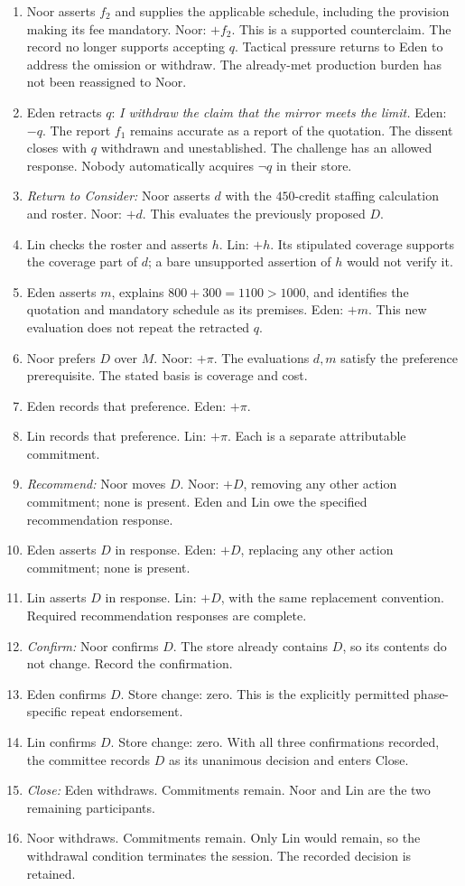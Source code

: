 \begin{enumerate}
Eden retains persuasion responsibility.
\item Noor asserts \(f_2\) and supplies the applicable schedule,
including the provision making its fee mandatory. Noor: \(+f_2\).
This is a supported counterclaim. The record no longer supports
accepting \(q\). Tactical pressure returns to Eden to address the
omission or withdraw. The already-met production burden has not
been reassigned to Noor.
\item Eden retracts \(q\): \emph{I withdraw the claim that the mirror
meets the limit.} Eden: \(-q\).
The report \(f_1\) remains accurate as a report of the quotation.
The dissent closes with \(q\) withdrawn and unestablished.
The challenge has an allowed response. Nobody automatically acquires
\(\neg q\) in their store.
\item \emph{Return to Consider:} Noor asserts \(d\) with the
\(450\)-credit staffing calculation and roster. Noor: \(+d\).
This evaluates the previously proposed \(D\).
\item Lin checks the roster and asserts \(h\). Lin: \(+h\).
Its stipulated coverage supports the coverage part of \(d\);
a bare unsupported assertion of \(h\) would not verify it.
\item Eden asserts \(m\), explains \(800+300=1100>1000\), and
identifies the quotation and mandatory schedule as its premises.
Eden: \(+m\). This new evaluation does not repeat the retracted \(q\).
\item Noor prefers \(D\) over \(M\). Noor: \(+\pi\).
The evaluations \(d,m\) satisfy the preference prerequisite.
The stated basis is coverage and cost.
\item Eden records that preference. Eden: \(+\pi\).
\item Lin records that preference. Lin: \(+\pi\).
Each is a separate attributable commitment.
\item \emph{Recommend:} Noor moves \(D\). Noor: \(+D\), removing
any other action commitment; none is present. Eden and Lin owe
the specified recommendation response.
\item Eden asserts \(D\) in response. Eden: \(+D\), replacing
any other action commitment; none is present.
\item Lin asserts \(D\) in response. Lin: \(+D\), with the same
replacement convention. Required recommendation responses are complete.
\item \emph{Confirm:} Noor confirms \(D\). The store already contains
\(D\), so its contents do not change. Record the confirmation.
\item Eden confirms \(D\). Store change: zero. This is the explicitly
permitted phase-specific repeat endorsement.
\item Lin confirms \(D\). Store change: zero. With all three
confirmations recorded, the committee records \(D\) as its unanimous
decision and enters Close.
\item \emph{Close:} Eden withdraws. Commitments remain.
Noor and Lin are the two remaining participants.
\item Noor withdraws. Commitments remain. Only Lin would remain,
so the withdrawal condition terminates the session. The recorded
decision is retained.
\end{enumerate}

